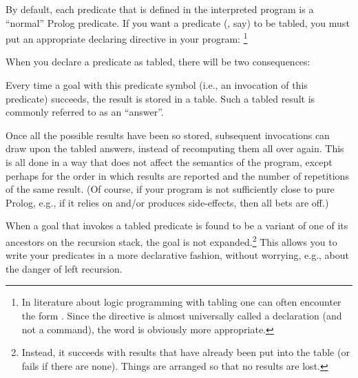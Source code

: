 %
%

By default, each predicate that is defined in the interpreted program is a
``normal'' Prolog predicate.  If you want a predicate (, say) to be
tabled, you must put an appropriate declaring directive in your
program:%
\footnote{
    In literature about logic programming with tabling one can often
    encounter the form .  Since the directive is
    almost universally called a declaration (and not a command), the word
     is obviously more appropriate.}\\
\ind{}\label{dir:tabled}

When you declare a predicate as tabled, there will be
two consequences:
\begin{Enumerate}
\item
  Every time a goal with this predicate symbol (i.e., an invocation of this
  predicate) succeeds, the result is stored in a table.  Such a tabled result
  is commonly referred to as an ``answer''.

  Once all the possible results have been so stored, subsequent invocations
  can draw upon the tabled answers, instead of recomputing them all over
  again. This is all done in a way that does not affect the semantics of the
  program, except perhaps for the order in which results are reported and the
  number of repetitions of the same result. (Of course, if your program is
  not sufficiently close to pure Prolog, e.g., if it relies on and/or
  produces side-effects, then all bets are off.)

\item
  When a goal that invokes a tabled predicate is found to be a variant of one
  of its ancestors on the recursion stack, the goal is not
  expanded.\footnote{
    Instead, it succeeds with results that have already been put into the
    table (or fails if there are none).  Things are arranged so that no
    results are lost.}
  This allows you to write your predicates in a more declarative fashion,
  without worrying, e.g., about the danger of left recursion.
\end{Enumerate}


